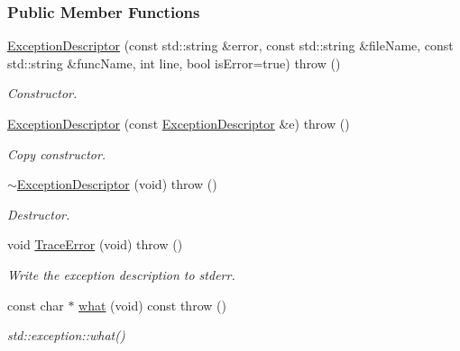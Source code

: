 \subsubsection*{Public Member Functions}
\begin{DoxyCompactItemize}
\item 
\hyperlink{group___core_abd7c2af705e7d6d9f2310fa676e1a74c}{Exception\-Descriptor} (const std\-::string \&error, const std\-::string \&file\-Name, const std\-::string \&func\-Name, int line, bool is\-Error=true)  throw ()
\begin{DoxyCompactList}\small\item\em Constructor. \end{DoxyCompactList}\item 
\hyperlink{group___core_a0d0840e46e4874851fcb4cb74767eeb3}{Exception\-Descriptor} (const \hyperlink{group___core_class_exception_descriptor}{Exception\-Descriptor} \&e)  throw ()
\begin{DoxyCompactList}\small\item\em Copy constructor. \end{DoxyCompactList}\item 
\hyperlink{group___core_accf5a093a12051f43c439aa5435b581a}{$\sim$\-Exception\-Descriptor} (void)  throw ()
\begin{DoxyCompactList}\small\item\em Destructor. \end{DoxyCompactList}\item 
void \hyperlink{group___core_a9796603ac150535b2986f307bb4e6f1b}{Trace\-Error} (void)  throw ()
\begin{DoxyCompactList}\small\item\em Write the exception description to stderr. \end{DoxyCompactList}\item 
const char $\ast$ \hyperlink{group___core_a9976a798b37f87e8e60d893e0ccaa86c}{what} (void) const   throw ()
\begin{DoxyCompactList}\small\item\em std\-::exception\-::what() \end{DoxyCompactList}\end{DoxyCompactItemize}
